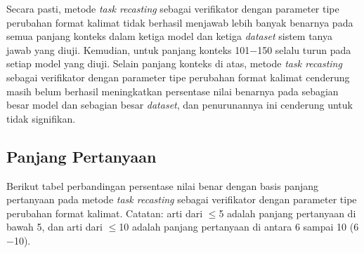 Secara pasti, metode \emph{task recasting} sebagai verifikator dengan parameter tipe perubahan format kalimat tidak berhasil menjawab lebih banyak benarnya pada semua panjang konteks dalam ketiga model dan ketiga \emph{dataset} sistem tanya jawab yang diuji. Kemudian, untuk panjang konteks 101$-$150 selalu turun pada setiap model yang diuji. Selain panjang konteks di atas, metode \emph{task recasting} sebagai verifikator dengan parameter tipe perubahan format kalimat cenderung masih belum berhasil meningkatkan persentase nilai benarnya pada sebagian besar model dan sebagian besar \emph{dataset}, dan penurunannya ini cenderung untuk tidak signifikan.

\subsection{Panjang Pertanyaan}
Berikut tabel perbandingan persentase nilai benar dengan basis panjang pertanyaan pada metode \emph{task recasting} sebagai verifikator dengan parameter tipe perubahan format kalimat. Catatan: arti dari $\leq$5 adalah panjang pertanyaan di bawah 5, dan arti dari $\leq$10 adalah panjang pertanyaan di antara 6 sampai 10 (6$-$10).

